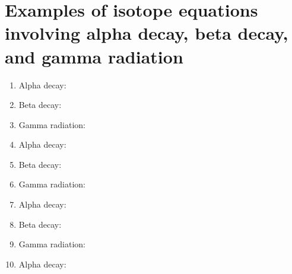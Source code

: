 \documentclass[border=5mm]{standalone}
\begin{document}
\begin{minipage}{\textwidth}

\section*{Examples of isotope equations involving alpha decay, beta decay, and gamma radiation}

\begin{enumerate}
  \item Alpha decay: 
  \item Beta decay: 
  \item Gamma radiation: 
  \item Alpha decay: 
  \item Beta decay: 
  \item Gamma radiation: 
  \item Alpha decay: 
  \item Beta decay: 
  \item Gamma radiation: 
  \item Alpha decay: 
\end {enumerate}
\end {minipage}
\end{document}
